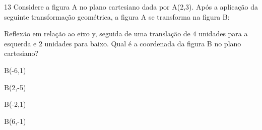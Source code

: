 

\num{13} Considere a figura A no plano cartesiano dada por A(2,3). Após a
aplicação da seguinte transformação geométrica, a figura A se transforma
na figura B:

Reflexão em relação ao eixo y, seguida de uma translação de $4$ unidades
para a esquerda e $2$ unidades para baixo. Qual é a coordenada da figura B no plano cartesiano?

\begin{escolha}
\item B(-6,1)
\item B(2,-5)
\item B(-2,1)
\item B(6,-1)
\end{escolha}



